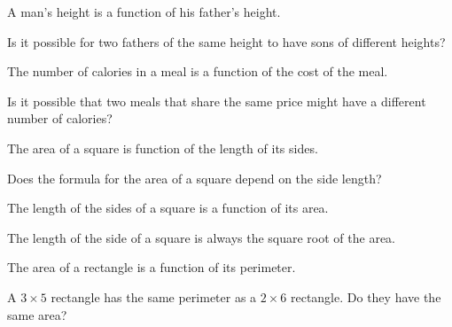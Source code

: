 \documentclass{ximera}
\begin{document}
\begin{question}
A man's height is a function of his father's height.
    \begin{multipleChoice}
    \end{multipleChoice}
    \begin{hint}
    Is it possible for two fathers of the same height to have sons of different heights?
    \end{hint}
\end{question}

\begin{question}
The number of calories in a meal is a function of the cost of the meal.
    \begin{multipleChoice}
    \end{multipleChoice}
    \begin{hint}
    Is it possible that two meals that share the same price might have a different number of calories?
    \end{hint}
\end{question}

\begin{question}
The area of a square is function of the length of its sides.
    \begin{multipleChoice}
    \end{multipleChoice}
    \begin{hint}
    Does the formula for the area of a square depend on the side length?
    \end{hint}
\end{question}

\begin{question}
The length of the sides of a square is a function of its area.
    \begin{multipleChoice}
    \end{multipleChoice}
    \begin{hint}
    The length of the side of a square is always the square root of the area.
    \end{hint}
\end{question}
      
\begin{question}
The area of a rectangle is a function of its perimeter.
    \begin{multipleChoice}
    \end{multipleChoice}
    \begin{hint}
    A $3\times 5$ rectangle has the same perimeter as a $2\times 6$ rectangle. Do they have the same area?
    \end{hint}
\end{question}
      
\end{document}
